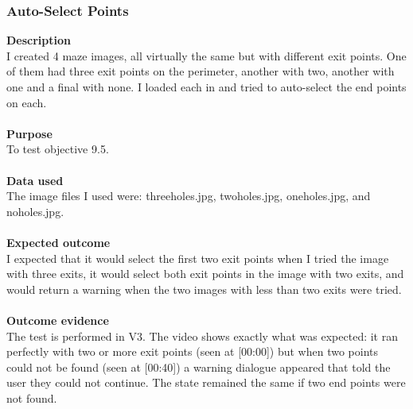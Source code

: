 \documentclass[titlepage]{article}
\begin{document}
\subsubsection{Auto-Select Points}
\textbf{Description}\\
I created 4 maze images, all virtually the same but with different exit points. One of them had three exit points on the perimeter, another with two, another with one and a final with none. I loaded each in and tried to auto-select the end points on each. \\\\
\textbf{Purpose}\\
To test objective 9.5.\\\\
\textbf{Data used} \\
The image files I used were: threeholes.jpg, twoholes.jpg, oneholes.jpg, and noholes.jpg.\\\\
\textbf{Expected outcome}\\
I expected that it would select the first two exit points when I tried the image with three exits, it would select both exit points in the image with two exits, and would return a warning when the two images with less than two exits were tried.\\\\
\textbf{Outcome evidence}\\
The test is performed in V3. The video shows exactly what was expected: it ran perfectly with two or more exit points (seen at [00:00]) but when two points could not be found (seen at [00:40]) a warning dialogue appeared that told the user they could not continue. The state remained the same if two end points were not found. 
\end{document}
